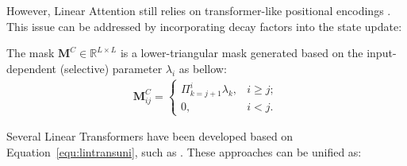 However, Linear Attention still relies on transformer-like positional encodings \cite{vaswani_attention_2017}. This issue can be addressed by incorporating decay factors into the state update:
\vspace{-10mm}

\hspace{-5mm}

The mask $\mathbf{M}^C \in \mathbb{R}^{L \times L}$ is a lower-triangular mask generated based on the input-dependent (selective) parameter $\lambda_i$ as bellow:
\vspace{-3mm}
\begin{align}
\label{eq:maskselcause}
     \mathbf{M}^C_{ij} = 
    \begin{cases} 
    \Pi_{k=j+1}^{i}{\lambda_k}, & i \geq j;  \\
    0, & i < j.
\end{cases} 
\end{align}

\vspace{-4mm}
 Several Linear Transformers have been developed based on Equation~\eqref{equ:lintransuni}, such as \citet{performer,peng2021random,xlstm,retnet,yang2023gated}. These approaches can be unified as:
\vspace{-5mm}

